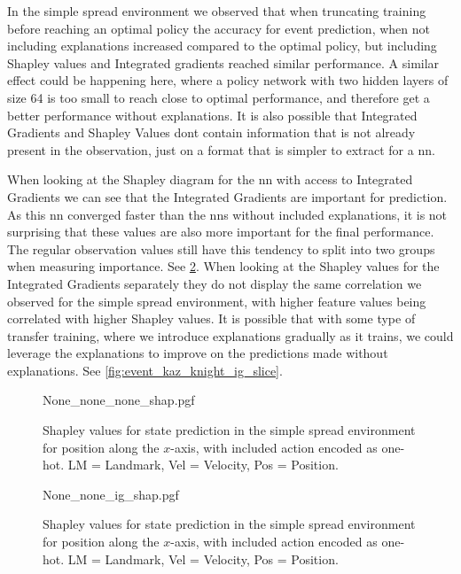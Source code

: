 \documentclass[UKenglish]{uiomasterthesis}
\begin{document}
In the simple spread environment we observed that when truncating training before reaching an optimal policy the accuracy for event prediction, when not including explanations increased compared to the optimal policy, but including Shapley values and Integrated gradients reached similar performance. A similar effect could be happening here, where a policy network with two hidden layers of size 64 is too small to reach close to optimal performance, and therefore get a better performance without explanations. It is also possible that Integrated Gradients and Shapley Values dont contain information that is not already present in the observation, just on a format that is simpler to extract for a \ac{nn}.

When looking at the Shapley diagram for the \ac{nn} with access to Integrated Gradients we can see that the Integrated Gradients are important for prediction. As this \ac{nn} converged faster than the \acp{nn} without included explanations, it is not surprising that these values are also more important for the final performance. The regular observation values still have this tendency to split into two groups when measuring importance. See \cref{fig:event_kaz_knight_ig}. When looking at the Shapley values for the Integrated Gradients separately they do not display the same correlation we observed for the simple spread environment, with higher feature values being correlated with higher Shapley values. It is possible that with some type of transfer training, where we introduce explanations gradually as it trains, we could leverage the explanations to improve on the predictions made without explanations. See \cref{fig:event_kaz_knight_ig_slice}.

\begin{figure}[H]
\centering
{None_none_none_shap.pgf}
\caption{Shapley values for state prediction in the simple spread environment for position along the $x$-axis, with included action encoded as one-hot. LM = Landmark, Vel = Velocity, Pos = Position.}
\label{fig:event_kaz_knight}
\end{figure}

\begin{figure}[H]
\centering
{None_none_ig_shap.pgf}
\caption{Shapley values for state prediction in the simple spread environment for position along the $x$-axis, with included action encoded as one-hot. LM = Landmark, Vel = Velocity, Pos = Position.}
\label{fig:event_kaz_knight_ig}
\end{figure}
\end{document}
